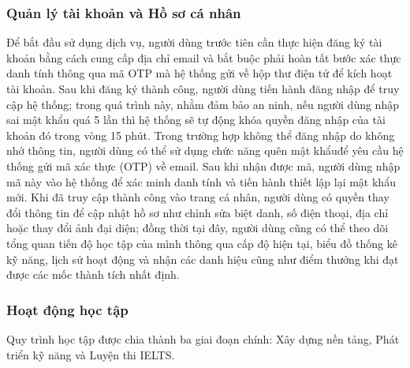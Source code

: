 \documentclass[a4paper,12pt]{extreport}
\begin{document}
\subsubsection{Quản lý tài khoản và Hồ sơ cá nhân}
Để bắt đầu sử dụng dịch vụ, người dùng trước tiên cần thực hiện đăng ký tài khoản bằng cách cung cấp địa chỉ email và bắt buộc phải hoàn tất bước xác thực danh tính thông qua mã OTP mà hệ thống gửi về hộp thư điện tử để kích hoạt tài khoản. Sau khi đăng ký thành công, người dùng tiến hành đăng nhập để truy cập hệ thống; trong quá trình này, nhằm đảm bảo an ninh, nếu người dùng nhập sai mật khẩu quá 5 lần thì hệ thống sẽ tự động khóa quyền đăng nhập của tài khoản đó trong vòng 15 phút. Trong trường hợp không thể đăng nhập do không nhớ thông tin, người dùng có thể sử dụng chức năng quên mật khẩuđể yêu cầu hệ thống gửi mã xác thực (OTP) về email. Sau khi nhận được mã, người dùng nhập mã này vào hệ thống để xác minh danh tính và tiến hành thiết lập lại mật khẩu mới. Khi đã truy cập thành công vào trang cá nhân, người dùng có quyền thay đổi thông tin để cập nhật hồ sơ như chỉnh sửa biệt danh, số điện thoại, địa chỉ hoặc thay đổi ảnh đại diện; đồng thời tại đây, người dùng cũng có thể theo dõi tổng quan tiến độ học tập của mình thông qua cấp độ hiện tại, biểu đồ thống kê kỹ năng, lịch sử hoạt động và nhận các danh hiệu cũng như điểm thưởng khi đạt được các mốc thành tích nhất định. 

\subsubsection{Hoạt động học tập}
Quy trình học tập được chia thành ba giai đoạn chính: Xây dựng nền tảng, Phát triển kỹ năng và Luyện thi IELTS.
\end{document}
